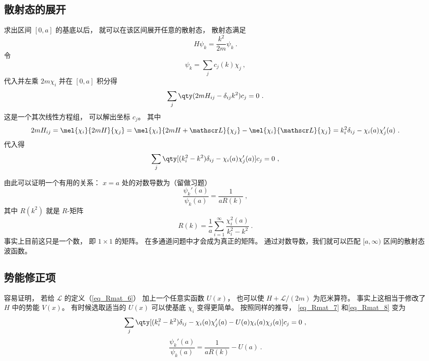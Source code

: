 \subsection{散射态的展开}
求出区间 $[0,a]$ 的基底以后， 就可以在该区间展开任意的散射态， 散射态满足
\begin{equation}\label{eq_Rmat_4}
H\psi_k = \frac{k^2}{2m}\psi_k~.
\end{equation}
令
\begin{equation}\label{eq_Rmat_5}
\psi_k = \sum_j c_j(k)\chi_j~,
\end{equation}
代入并左乘 $2m\chi_i$ 并在 $[0,a]$ 积分得
\begin{equation}
\sum_j \qty(2mH_{ij} - \delta_{ij}k^2) c_j = 0~.
\end{equation}
这是一个其次线性方程组， 可以解出坐标 $c_j$。 其中
\begin{equation}
2mH_{ij} = \mel{\chi_i}{2mH}{\chi_j} = \mel{\chi_i}{2mH + \mathscr L}{\chi_j} - \mel{\chi_i}{\mathscr L}{\chi_j} 
= k_i^2\delta_{ij} - \chi_i(a)\chi'_j(a)~.
\end{equation}
代入得
\begin{equation}\label{eq_Rmat_7}
\sum_j \qty[(k_i^2 - k^2)\delta_{ij} - \chi_i(a)\chi'_j(a)] c_j = 0~,
\end{equation}

由此可以证明一个有用的关系： $x=a$ 处的对数导数为（留做习题）
\begin{equation}\label{eq_Rmat_8}
\frac{\psi_k'(a)}{\psi_k(a)} = \frac{1}{aR(k)}~,
\end{equation}
其中 $R(k^2)$ 就是 $R$-矩阵
\begin{equation}
R(k) = \frac{1}{a} \sum_{i=1}^\infty \frac{\chi_i^2(a)}{k_i^2 - k^2}~.
\end{equation}
事实上目前这只是一个数， 即 $1\times 1$ 的矩阵。 在多通道问题中才会成为真正的矩阵。 通过对数导数，我们就可以匹配 $[a,\infty)$ 区间的散射态波函数。

\subsection{势能修正项}
容易证明， 若给 $\mathscr L$ 的定义（\autoref{eq_Rmat_6}） 加上一个任意实函数 $U(x)$， 也可以使 $H+\mathscr L/(2m)$ 为厄米算符。 事实上这相当于修改了 $H$ 中的势能 $V(x)$。 有时候选取适当的 $U(x)$ 可以使基底 $\chi_i$ 变得更简单。 按照同样的推导， \autoref{eq_Rmat_7} 和\autoref{eq_Rmat_8} 变为
\begin{equation}
\sum_j \qty[(k_i^2 - k^2)\delta_{ij} - \chi_i(a)\chi'_j(a) - U(a)\chi_i(a)\chi_j(a)] c_j = 0~,
\end{equation}
\begin{equation}
\frac{\psi_k'(a)}{\psi_k(a)} = \frac{1}{aR(k)} - U(a)~.
\end{equation}
